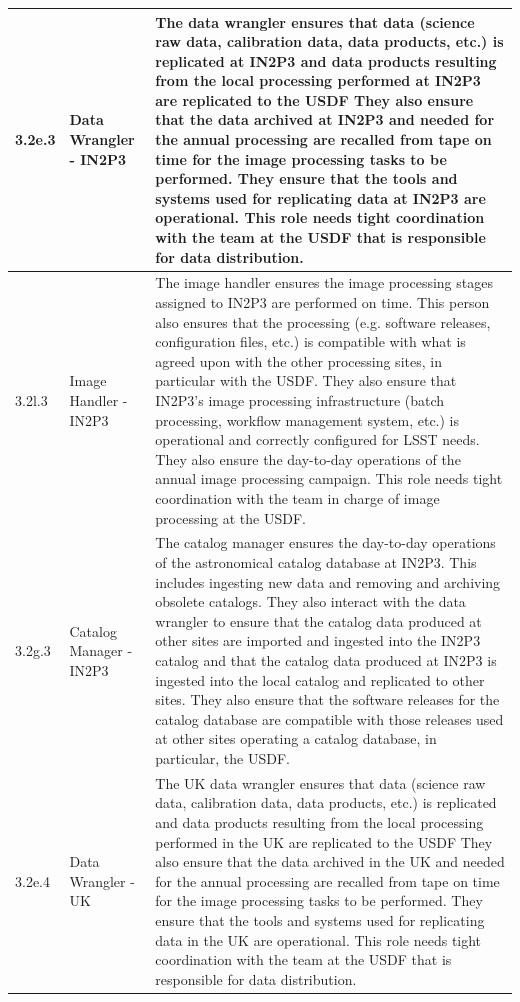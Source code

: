 \begin{longtable} {|p{}|p{}|p{}|}
{3.2e.3}&{Data Wrangler - IN2P3}&{The data wrangler ensures that data (science raw data, calibration data, data products, etc.) is replicated at IN2P3 and data products resulting from the local processing performed at IN2P3 are replicated to the USDF They also ensure that the data archived at IN2P3 and needed for the annual processing are recalled from tape on time for the image processing tasks to be performed. They ensure that the tools and systems used for replicating data at IN2P3 are operational. This role needs tight coordination with the team at the USDF that is responsible for data distribution.} \\ \hline
{3.2l.3}&{Image Handler - IN2P3}&{The image handler ensures the image processing stages assigned to IN2P3 are performed on time. This person also ensures that the processing (e.g. software releases, configuration files, etc.) is compatible with what is agreed upon with the other processing sites, in particular with the USDF. They also ensure that IN2P3's image processing infrastructure (batch processing, workflow management system, etc.) is operational and correctly configured for LSST needs. They also ensure the day-to-day operations of the annual image processing campaign. This role needs tight coordination with the team in charge of image processing at the USDF.} \\ \hline
{3.2g.3}&{Catalog Manager - IN2P3}&{The catalog manager ensures the day-to-day operations of the astronomical catalog database at IN2P3. This includes ingesting new data and removing and archiving obsolete catalogs. They also interact with the data wrangler to ensure that the catalog data produced at other sites are imported and ingested into the IN2P3 catalog and that the catalog data produced at IN2P3 is ingested into the local catalog and replicated to other sites. They also ensure that the software releases for the catalog database are compatible with those releases used at other sites operating a catalog database, in particular, the USDF.} \\ \hline
{3.2e.4}&{Data Wrangler - UK}&{The UK data wrangler ensures that data (science raw data, calibration data, data products, etc.) is replicated and data products resulting from the local processing performed in the UK are replicated to the USDF They also ensure that the data archived in the UK and needed for the annual processing are recalled from tape on time for the image processing tasks to be performed. They ensure that the tools and systems used for replicating data in the UK are operational. This role needs tight coordination with the team at the USDF that is responsible for data distribution.} \\ \hline

\end{longtable}
